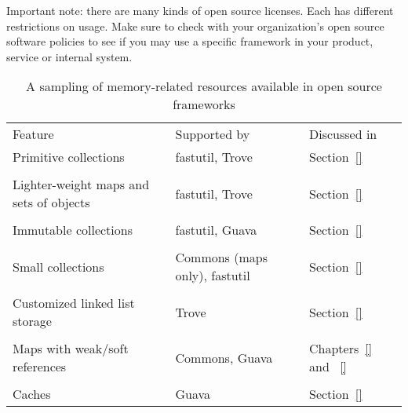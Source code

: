 Important note: there are many kinds of open source licenses. Each has different
restrictions on usage. Make sure to check with your organization's open
source software policies to see if you may use a specific framework in 
your product, service or internal system.

\begin{table}
\centering
	\begin{tabular}{p{6cm} p{3cm} p{4cm}}
	\toprule

	   Feature & Supported by & Discussed in
	\\ \cmidrule(r){1-1} \cmidrule(l){2-2} \cmidrule(l){3-3}
	Primitive collections & fastutil, Trove & Section~\ref{}
	\\
	\\
	Lighter-weight maps and sets of objects & fastutil, Trove & Section~\ref{}
	\\
	\\
	Immutable collections & fastutil, Guava & Section~\ref{}
	\\
	\\
	Small collections & Commons (maps only), fastutil & Section~\ref{}
	\\
	\\
	Customized linked list storage & Trove & Section~\ref{}
	\\
	\\
	Maps with weak/soft references & Commons, Guava & Chapters~\ref{} and ~\ref{}
	\\
	\\
	Caches & Guava & Section~\ref{}
	\\
	\bottomrule
	\end{tabular}
	\caption{A sampling of memory-related resources available in open source
	frameworks}
	\label{tab:alternative-collections}
\end{table}


